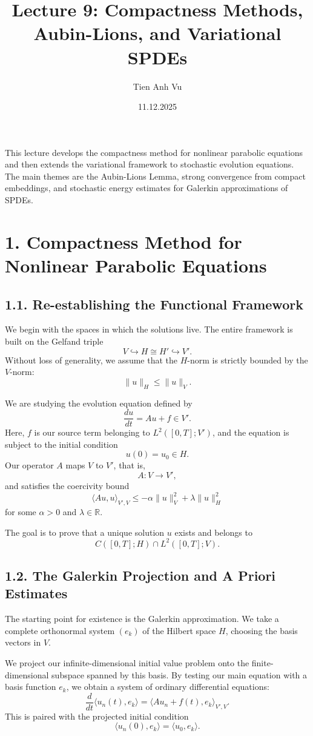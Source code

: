 \documentclass[11pt]{article}
\title{Lecture 9: Compactness Methods, Aubin-Lions, and Variational SPDEs}
\date{11.12.2025}
\author{Tien Anh Vu}
\theoremstyle{definition}
\theoremstyle{remark}
\begin{document}
\maketitle

This lecture develops the compactness method for nonlinear parabolic equations and then extends the variational framework to stochastic evolution equations. The main themes are the Aubin-Lions Lemma, strong convergence from compact embeddings, and stochastic energy estimates for Galerkin approximations of SPDEs.

\section*{1. Compactness Method for Nonlinear Parabolic Equations}

\subsection*{1.1. Re-establishing the Functional Framework}
We begin with the spaces in which the solutions live. The entire framework is built on the Gelfand triple
\[
V\hookrightarrow H\cong H' \hookrightarrow V'.
\]
Without loss of generality, we assume that the \(H\)-norm is strictly bounded by the \(V\)-norm:
\[
\|u\|_H\le \|u\|_V.
\]

We are studying the evolution equation defined by
\[
\frac{du}{dt}=Au+f\in V'.
\]
Here, \(f\) is our source term belonging to \(L^2([0,T];V')\), and the equation is subject to the initial condition
\[
u(0)=u_0\in H.
\]
Our operator \(A\) maps \(V\) to \(V'\), that is,
\[
A:V\to V',
\]
and satisfies the coercivity bound
\[
\langle Au,u\rangle_{V',V}\le -\alpha\|u\|_V^2+\lambda\|u\|_H^2
\]
for some \(\alpha>0\) and \(\lambda\in\mathbb R\).

The goal is to prove that a unique solution \(u\) exists and belongs to
\[
C([0,T];H)\cap L^2([0,T];V).
\]

\subsection*{1.2. The Galerkin Projection and A Priori Estimates}
The starting point for existence is the Galerkin approximation. We take a complete orthonormal system \((e_k)\) of the Hilbert space \(H\), choosing the basis vectors in \(V\).

We project our infinite-dimensional initial value problem onto the finite-dimensional subspace spanned by this basis. By testing our main equation with a basis function \(e_k\), we obtain a system of ordinary differential equations:
\[
\frac{d}{dt}\langle u_n(t),e_k\rangle
=
\langle Au_n+f(t),e_k\rangle_{V',V}.
\]
This is paired with the projected initial condition
\[
\langle u_n(0),e_k\rangle=\langle u_0,e_k\rangle.
\]
\end{document}

